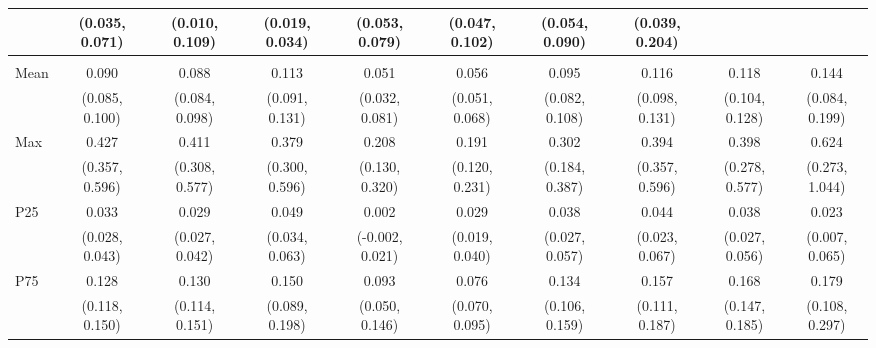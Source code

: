 {\begin{tabular}{l|c|c|c|c|c|c|c|c|c}
& {\scriptsize (0.035, 0.071)}
& {\scriptsize (0.010, 0.109)}
& {\scriptsize (0.019, 0.034)}
& {\scriptsize (0.053, 0.079)}
& {\scriptsize (0.047, 0.102)}
& {\scriptsize (0.054, 0.090)}
& {\scriptsize (0.039, 0.204)}
\\ [0.1cm]
\hline
\noalign{\smallskip}
\multicolumn{10}{l}{\textbf{Effect with Leads and Lags}} \\
\noalign{\smallskip}
\hline
Mean
& 0.090 & 0.088 & 0.113 & 0.051 & 0.056 & 0.095 & 0.116 & 0.118 & 0.144 \\
& {\scriptsize (0.085, 0.100)}
& {\scriptsize (0.084, 0.098)}
& {\scriptsize (0.091, 0.131)}
& {\scriptsize (0.032, 0.081)}
& {\scriptsize (0.051, 0.068)}
& {\scriptsize (0.082, 0.108)}
& {\scriptsize (0.098, 0.131)}
& {\scriptsize (0.104, 0.128)}
& {\scriptsize (0.084, 0.199)}
\\ [0.1cm]
\hline
Max
& 0.427 & 0.411 & 0.379 & 0.208 & 0.191 & 0.302 & 0.394 & 0.398 & 0.624 \\
& {\scriptsize (0.357, 0.596)}
& {\scriptsize (0.308, 0.577)}
& {\scriptsize (0.300, 0.596)}
& {\scriptsize (0.130, 0.320)}
& {\scriptsize (0.120, 0.231)}
& {\scriptsize (0.184, 0.387)}
& {\scriptsize (0.357, 0.596)}
& {\scriptsize (0.278, 0.577)}
& {\scriptsize (0.273, 1.044)}
\\ [0.1cm]
\hline
P25
& 0.033 & 0.029 & 0.049 & 0.002 & 0.029 & 0.038 & 0.044 & 0.038 & 0.023 \\
& {\scriptsize (0.028, 0.043)}
& {\scriptsize (0.027, 0.042)}
& {\scriptsize (0.034, 0.063)}
& {\scriptsize (-0.002, 0.021)}
& {\scriptsize (0.019, 0.040)}
& {\scriptsize (0.027, 0.057)}
& {\scriptsize (0.023, 0.067)}
& {\scriptsize (0.027, 0.056)}
& {\scriptsize (0.007, 0.065)}
\\ [0.1cm]
\hline
P75
& 0.128 & 0.130 & 0.150 & 0.093 & 0.076 & 0.134 & 0.157 & 0.168 & 0.179 \\
& {\scriptsize (0.118, 0.150)}
& {\scriptsize (0.114, 0.151)}
& {\scriptsize (0.089, 0.198)}
& {\scriptsize (0.050, 0.146)}
& {\scriptsize (0.070, 0.095)}
& {\scriptsize (0.106, 0.159)}
& {\scriptsize (0.111, 0.187)}
& {\scriptsize (0.147, 0.185)}
& {\scriptsize (0.108, 0.297)}
\\ [0.1cm]
\hline
\hline
\end{tabular}
}

